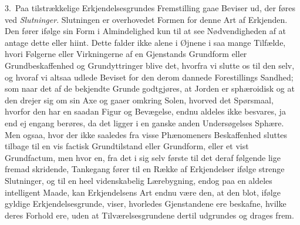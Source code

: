 \documentclass[12pt,a4paper]{book}
\newcommand{\apage}[1]{\marginnote{\footnotesize\textit{[#1]}}}
\begin{document}
3.~Paa tilstrækkelige Erkjendelsesgrundes Fremstilling gaae Beviser ud, der føres
ved \emph{Slutninger}. Slutningen er overhovedet Formen for denne Art af
Erkjenden. Den fører ifølge sin Form i Almindelighed kun til at see
Nødvendigheden af at antage dette eller hiint. Dette falder ikke alene i Øjnene i
saa mange Tilfælde, hvori Følgerne eller Virkningerne af en Gjenstands Grundform
eller Grundbeskaffenhed og Grundyttringer blive det, hvorfra vi slutte os til den
selv, og hvoraf vi altsaa udlede Beviset for den derom dannede Forestillings
Sandhed; som naar det af de bekjendte Grunde godtgjøres, at Jorden er sphæroidisk
og at den drejer sig om sin Axe og gaaer omkring Solen, hvorved det Spørsmaal,
hvorfor den har en saadan Figur og Bevægelse, endnu aldeles ikke besvares, ja end
ej engang berøres, da det ligger i en ganske anden Undersøgelses Sphære. Men
ogsaa, hvor der ikke saaledes fra visse Phænomeners Beskaffenhed sluttes tilbage
til en vis factisk Grundtilstand eller Grundform, eller et vist Grundfactum, men
hvor en, fra det i sig selv første til det deraf følgende lige fremad  \apage{77} skridende,
Tankegang fører til en Række af Erkjendelser ifølge strenge Slutninger, og til en
heel videnskabelig Lærebygning, endog paa en aldeles intelligent Maade, kan
Erkjendelsens Art endnu være den, at den blot, ifølge gyldige Erkjendelsesgrunde,
viser, hvorledes Gjenstandene ere beskafne, hvilke deres Forhold ere, uden at
Tilværelsesgrundene dertil udgrundes og drages frem.
\end{document}
